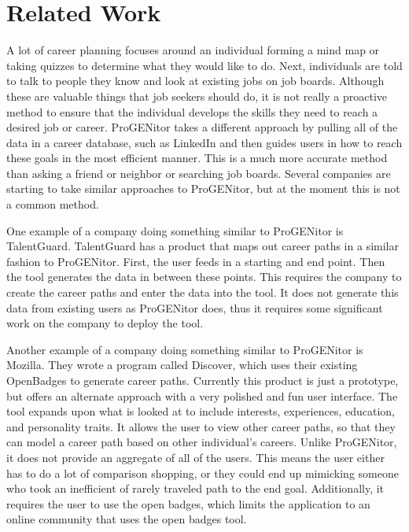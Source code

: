 \section{Related Work}
\label{sect:related-work}
A lot of career planning focuses around an individual forming a mind map or
taking quizzes to determine what they would like to do.  Next, individuals
are told to talk to people they know and look at existing jobs on job boards. 
Although these are valuable things that job seekers should do, it is not really
a proactive method to ensure that the individual develops the skills they need
to reach a desired job or career.  ProGENitor takes a different approach by
pulling all of the data in a career database, such as LinkedIn and then guides
users in how to reach these goals in the most efficient manner.  This is a much
more accurate method than asking a friend or neighbor or searching job boards. 
Several companies are starting to take similar approaches to ProGENitor, but at
the moment this is not a common method.

One example of a company doing something similar to ProGENitor is
TalentGuard\cite{talentguard}.  TalentGuard has a product that maps out career
paths in a similar fashion to ProGENitor.  First, the user feeds in a starting
and end point.  Then the tool generates the data in between these points.  This
requires the company to create the career paths and enter the data into the
tool.  It does not generate this data from existing users as ProGENitor does,
thus it requires some significant work on the company to deploy the tool.

Another example of a company doing something similar to ProGENitor is Mozilla. 
They wrote a program called Discover\cite{discover}, which uses their existing
OpenBadges\cite{openbadges} to generate career paths.  Currently this product is
just a prototype, but offers an alternate approach with a very polished and fun
user interface.  The tool expands upon what is looked at to include interests,
experiences, education, and personality traits.  It allows the user to view
other career paths, so that they can model a career path based on other
individual's careers.  Unlike ProGENitor, it does not provide an aggregate of
all of the users.  This means the user either has to do a lot of comparison
shopping, or they could end up mimicking someone who took an
inefficient of rarely traveled path to the end goal.  Additionally, it requires
the user to use the open badges, which limits the application to an online
community that uses the open badges tool.

